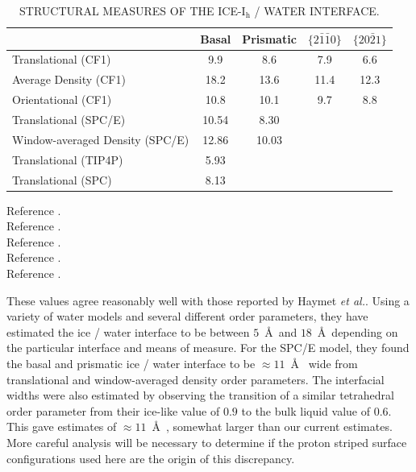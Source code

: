 \begin{table}[h]
\centering
\caption{STRUCTURAL MEASURES OF THE ICE-I$_\mathrm{h}$ / WATER
  INTERFACE. \label{tab:structCompare}} 
\begin{tabular}{|l|cccc|}  
\hline
& Basal & Prismatic & $\{2\bar{1}\bar{1}0\}$ & $\{20\bar{2}1\}$ \\
\hline
Translational (CF1)\footnotemark[1] & 9.9 & 8.6  & 7.9 & 6.6 \\
Average Density (CF1)\footnotemark[1] & 18.2 & 13.6 & 11.4 & 12.3 \\
Orientational (CF1)\footnotemark[2] & 10.8 & 10.1 & 9.7 & 8.8 \\
Translational (SPC/E)\footnotemark[5] & 10.54 & 8.30 & & \\
Window-averaged Density (SPC/E) \footnotemark[5] & 12.86 & 10.03 & & \\
Translational (TIP4P)\footnotemark[3] & 5.93 & & & \\
Translational (SPC)\footnotemark[4] & 8.13 & & & \\
\hline
\end{tabular}
\flushleft
  \footnotemark[1]\footnotesize{Reference \cite{Hayward2001}.} \\
  \footnotemark[2]\footnotesize{Reference \cite{Hayward2002}.} \\
  \footnotemark[3]\footnotesize{Reference \cite{Karim1988}.} \\
  \footnotemark[4]\footnotesize{Reference \cite{Karim1990}.} \\
  \footnotemark[5]\footnotesize{Reference \cite{Bryk2002}.} \\
\end{table}








These values agree reasonably well with those reported by Haymet
\textit{et
  al.}.\cite{Karim1988,Karim1990,Hayward2001,Bryk2002,Hayward2002,Bryk2004}
Using a variety of water models and several different order
parameters, they have estimated the ice / water interface to be
between $5$~\AA~and $18$~\AA~depending on the particular interface and
means of measure.  For the SPC/E model, they found the basal and
prismatic ice / water interface to be $\approx 11$~\AA~ wide from
translational and window-averaged density order parameters. The
interfacial widths were also estimated by observing the transition of
a similar tetrahedral order parameter from their ice-like value of
$0.9$ to the bulk liquid value of $0.6$. This gave estimates of
$\approx 11$~\AA~, somewhat larger than our current estimates. More
careful analysis will be necessary to determine if the proton striped
surface configurations used here are the origin of this discrepancy.


